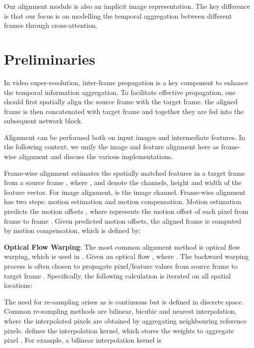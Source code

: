 \documentclass[10pt,twocolumn,letterpaper]{article}
\begin{document}
Our alignment module is also an implicit image representation.  The key difference is that our focus is on modelling the temporal aggregation between different frames through cross-attention.
 
\section{Preliminaries}\label{sec:preliminary}

In video super-resolution, inter-frame propagation is a key component to enhance the temporal information aggregation. To facilitate effective propagation, one should first spatially align the source frame with the target frame. the aligned frame  is then concatenated with target frame  and together they are fed into the subsequent network block.



Alignment can be performed both on input images and intermediate features. In the following context, we unify the image and feature alignment here as frame-wise alignment and discuss the various implementations.


Frame-wise alignment estimates the spatially matched features in a target frame  from a source frame , where ,  and  denote the channels, height and width of the feature vector. For image alignment,  is the image channel. 
Frame-wise alignment has two steps: motion estimation and motion compensation. 
Motion estimation predicts the motion offsets , where  represents the motion offset of each pixel from frame  to frame . Given predicted motion offsets, the aligned frame  is computed by motion compensation, which is defined by:

\noindent\textbf{Optical Flow Warping}:
The most common alignment method is optical flow warping, which is used in \cite{chan2021basicvsr,xue2019video_tof,lin2022unsupervised_S2SVR}. Given an optical flow , where .  The backward warping process is often chosen to propagate pixel/feature values from source frame  to target frame . Specifically, the following calculation is iterated on all spatial locations:

The need for re-sampling arises as  is continuous but  is defined in discrete space. Common re-sampling methods are bilinear, bicubic and nearest interpolation, where the interpolated pixels are obtained by aggregating neighbouring reference pixels.  defines the interpolation kernel, which stores the weights to aggregate pixel . For example, a bilinear interpolation kernel is
\end{document}

